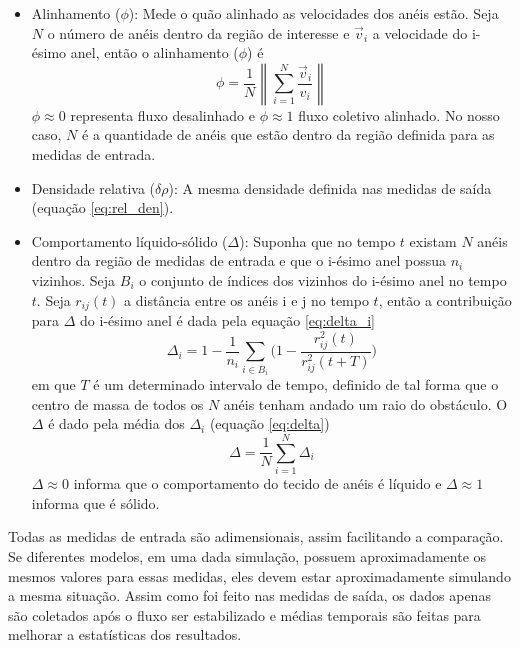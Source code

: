 \documentclass{article}
\theoremstyle{definition}
\newcommand\norm[1]{\left\lVert#1\right\rVert}
\begin{document}
\begin{itemize}
    \item Alinhamento ($\phi$): Mede o quão alinhado as velocidades dos anéis estão. Seja $N$ o número de anéis dentro da região de interesse e $\vec v_{i}$ a velocidade do i-ésimo anel, então o alinhamento ($\phi$) é
    \begin{equation}
    \phi = \frac{1}{N} \norm{\sum_{i=1}^N \frac{\vec v_{i}}{v_{i}}}
    \label{eq:input_alignment}
    \end{equation}
    $\phi \approx 0$ representa fluxo desalinhado e $\phi \approx 1$ fluxo coletivo alinhado. No nosso caso, $N$ é a quantidade de anéis que estão dentro da região definida para as medidas de entrada.

    \item Densidade relativa ($\delta \rho$): A mesma densidade definida nas medidas de saída (equação \ref{eq:rel_den}).

    \item Comportamento líquido-sólido ($\Delta$): Suponha que no tempo $t$ existam $N$ anéis dentro da região de medidas de entrada e que o i-ésimo anel possua $n_i$ vizinhos. Seja $B_i$ o conjunto de índices dos vizinhos do i-ésimo anel no tempo $t$. Seja $r_{ij}(t)$ a distância entre os anéis i e j no tempo $t$, então a contribuição para $\Delta$ do i-ésimo anel é dada pela equação \ref{eq:delta_i}
    \begin{equation}
    \Delta_i = 1 - \frac{1}{n_i}\sum_{i \in B_i}\bigg(1 - \frac{r_{ij}^2(t)}{r_{ij}^2(t + T)} \bigg)
    \label{eq:delta_i}
    \end{equation}
    em que $T$ é um determinado intervalo de tempo, definido de tal forma que o centro de massa de todos os $N$ anéis tenham andado um raio do obstáculo. O $\Delta$ é dado pela média dos $\Delta_i$ (equação \ref{eq:delta})
    \begin{equation}
        \Delta = \frac{1}{N}\sum_{i=1}^N\Delta_i
        \label{eq:delta}
    \end{equation}
    $\Delta \approx 0$ informa que o comportamento do tecido de anéis é líquido e $\Delta \approx 1$ informa que é sólido. 
\end{itemize}
Todas as medidas de entrada são adimensionais, assim facilitando a comparação. Se diferentes modelos, em uma dada simulação, possuem aproximadamente os mesmos valores para essas medidas, eles devem estar aproximadamente simulando a mesma situação. Assim como foi feito nas medidas de saída, os dados apenas são coletados após o fluxo ser estabilizado e médias temporais são feitas para melhorar a estatísticas dos resultados.



%
\end{document}
